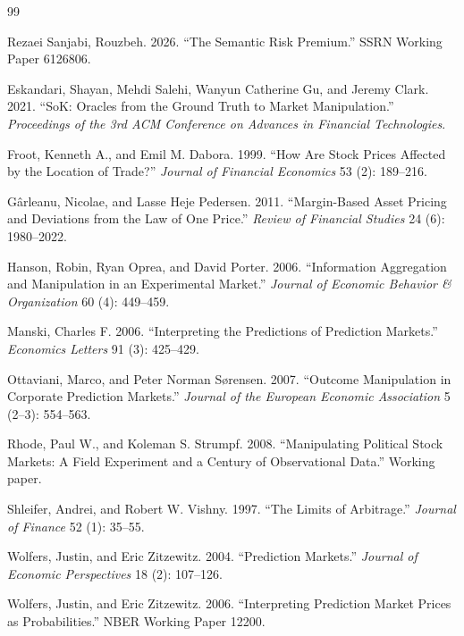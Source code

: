\documentclass[11pt]{article}
\begin{document}
\begin{thebibliography}{99}

Rezaei Sanjabi, Rouzbeh. 2026.
``The Semantic Risk Premium.'' SSRN Working Paper 6126806.

Eskandari, Shayan, Mehdi Salehi, Wanyun Catherine Gu, and Jeremy Clark. 2021.
``SoK: Oracles from the Ground Truth to Market Manipulation.''
\textit{Proceedings of the 3rd ACM Conference on Advances in Financial Technologies}.

Froot, Kenneth A., and Emil M. Dabora. 1999.
``How Are Stock Prices Affected by the Location of Trade?''
\textit{Journal of Financial Economics} 53 (2): 189--216.

G\^arleanu, Nicolae, and Lasse Heje Pedersen. 2011.
``Margin-Based Asset Pricing and Deviations from the Law of One Price.''
\textit{Review of Financial Studies} 24 (6): 1980--2022.

Hanson, Robin, Ryan Oprea, and David Porter. 2006.
``Information Aggregation and Manipulation in an Experimental Market.''
\textit{Journal of Economic Behavior \& Organization} 60 (4): 449--459.

Manski, Charles F. 2006.
``Interpreting the Predictions of Prediction Markets.''
\textit{Economics Letters} 91 (3): 425--429.

Ottaviani, Marco, and Peter Norman S\o rensen. 2007.
``Outcome Manipulation in Corporate Prediction Markets.''
\textit{Journal of the European Economic Association} 5 (2--3): 554--563.

Rhode, Paul W., and Koleman S. Strumpf. 2008.
``Manipulating Political Stock Markets: A Field Experiment and a Century of
Observational Data.'' Working paper.

Shleifer, Andrei, and Robert W. Vishny. 1997.
``The Limits of Arbitrage.'' \textit{Journal of Finance} 52 (1): 35--55.

Wolfers, Justin, and Eric Zitzewitz. 2004.
``Prediction Markets.'' \textit{Journal of Economic Perspectives} 18 (2): 107--126.

Wolfers, Justin, and Eric Zitzewitz. 2006.
``Interpreting Prediction Market Prices as Probabilities.'' NBER Working Paper 12200.

\end{thebibliography}
\end{document}
